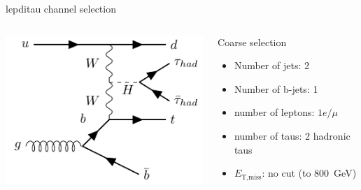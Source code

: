 \begin{frame}{\tHq lepditau channel selection}
  \begin{columns}
    \begin{column}{0.5\textwidth}
      \centering \includegraphics[width=\textwidth]{tHq_tautau}\\
    \end{column}
    \begin{column}{0.5\textwidth}
      \begin{block}{Coarse selection}
         \begin{itemize}
           \item Number of jets: 2
           \item Number of b-jets: 1
           \item number of leptons: \bf{$1e / \mu$}
           \item number of taus: 2 hadronic taus
           \item $E_{\text{T,miss}}$: no cut (to \SI{800}{GeV})
         \end{itemize}
      \end{block}
    \end{column}
  \end{columns}
\end{frame}
  
